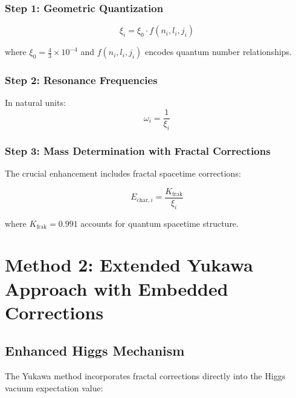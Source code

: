 \documentclass[12pt,a4paper]{article}
\begin{document}
	\subsubsection{Step 1: Geometric Quantization}
	\label{subsubsec:step1_enhanced}
	
	\begin{equation}
		\xi_i = \xi_0 \cdot f(n_i, l_i, j_i)
		\label{eq:geometric_quantization_enhanced}
	\end{equation}
	
	where $\xi_0 = \frac{4}{3} \times 10^{-4}$ and $f(n_i, l_i, j_i)$ encodes quantum number relationships.
	
	\subsubsection{Step 2: Resonance Frequencies}
	\label{subsubsec:step2_enhanced}
	
	In natural units:
	\begin{equation}
		\omega_i = \frac{1}{\xi_i}
		\label{eq:resonance_natural_enhanced}
	\end{equation}
	
	\subsubsection{Step 3: Mass Determination with Fractal Corrections}
	\label{subsubsec:step3_enhanced}
	
	The crucial enhancement includes fractal spacetime corrections:
	
	\begin{equation}
		\boxed{E_{\text{char},i} = \frac{K_{\text{frak}}}{\xi_i}}
		\label{eq:characteristic_energy_direct_enhanced}
	\end{equation}
	
	where $K_{\text{frak}} = 0.991$ accounts for quantum spacetime structure.
	
	\section{Method 2: Extended Yukawa Approach with Embedded Corrections}
	\label{sec:yukawa_method_enhanced}
	
	\subsection{Enhanced Higgs Mechanism}
	\label{subsec:enhanced_higgs}
	
	The Yukawa method incorporates fractal corrections directly into the Higgs vacuum expectation value:
	
\end{document}
